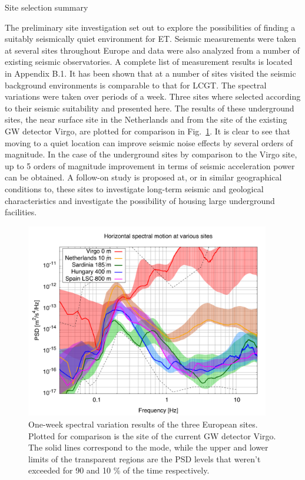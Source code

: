 \pagebreak

\FloatBarrier
{}
{Site selection summary}
{The preliminary site investigation set out to explore the possibilities of finding a suitably seismically quiet environment for ET. Seismic measurements were taken at several sites throughout Europe and data were also analyzed from a number of existing seismic observatories. A complete list of measurement results is located in Appendix B.1. It has been shown that at a number of sites visited the seismic background environments is comparable to that for LCGT. The spectral variations were taken over periods of a week. Three sites where selected according to their seismic suitability and presented here. The results of these underground sites, the near surface site in the Netherlands and from the site of the existing GW detector Virgo, are plotted for comparison in Fig.~\ref{fig:sitecomparison}. It is clear to see that moving to a quiet location can improve seismic noise effects by several orders of magnitude. In the case of the underground sites by comparison to the Virgo site, up to 5 orders of magnitude improvement in terms of seismic acceleration power can be obtained. A follow-on study is proposed at, or in similar geographical conditions to, these sites to investigate long-term seismic and geological characteristics and investigate the possibility of housing large underground facilities. 
\begin{figure}[H]
\centering
	\includegraphics[width=0.95\textwidth]{./Sec_SiteInfra/Figures/BestSiteComparison.pdf}
	\vskip 0.3cm
	\caption{One-week spectral variation results of the three European sites. Plotted for comparison is the site of the current GW detector Virgo. The solid lines correspond to the mode, while the upper and lower limits of the transparent regions are the PSD levels that weren't exceeded for 90 and 10 \% of the time respectively.}
	\label{fig:sitecomparison}
	\end{figure}
}
